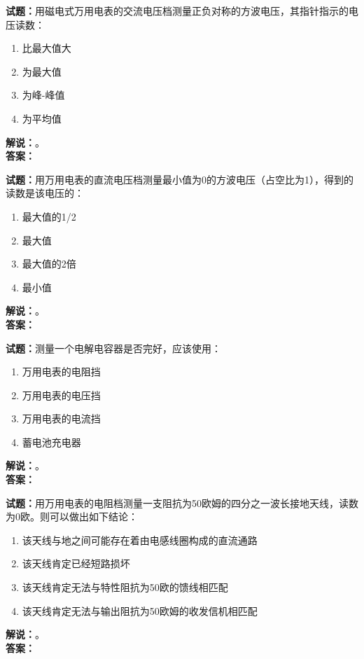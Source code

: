 \documentclass{ctexbook}
\begin{document}
\vspace{\baselineskip}

\noindent\textbf{试题：}用磁电式万用电表的交流电压档测量正负对称的方波电压，其指针指示的电压读数：
\begin{enumerate}[leftmargin=3em]
  \item 比最大值大
  \item 为最大值
  \item 为峰-峰值
  \item 为平均值
\end{enumerate}
\noindent\textbf{解说：}\textbf{}。\\\noindent\textbf{答案：}

\vspace{\baselineskip}

\noindent\textbf{试题：}用万用电表的直流电压档测量最小值为0的方波电压（占空比为1），得到的读数是该电压的：
\begin{enumerate}[leftmargin=3em]
  \item 最大值的1/2
  \item 最大值
  \item 最大值的2倍
  \item 最小值
\end{enumerate}
\noindent\textbf{解说：}\textbf{}。\\\noindent\textbf{答案：}

\vspace{\baselineskip}

\noindent\textbf{试题：}测量一个电解电容器是否完好，应该使用：
\begin{enumerate}[leftmargin=3em]
  \item 万用电表的电阻挡
  \item 万用电表的电压挡
  \item 万用电表的电流挡
  \item 蓄电池充电器
\end{enumerate}
\noindent\textbf{解说：}\textbf{}。\\\noindent\textbf{答案：}

\vspace{\baselineskip}

\noindent\textbf{试题：}用万用电表的电阻档测量一支阻抗为50欧姆的四分之一波长接地天线，读数为0欧。则可以做出如下结论：
\begin{enumerate}[leftmargin=3em]
  \item 该天线与地之间可能存在着由电感线圈构成的直流通路
  \item 该天线肯定已经短路损坏
  \item 该天线肯定无法与特性阻抗为50欧的馈线相匹配
  \item 该天线肯定无法与输出阻抗为50欧姆的收发信机相匹配
\end{enumerate}
\noindent\textbf{解说：}\textbf{}。\\\noindent\textbf{答案：}
\end{document}
